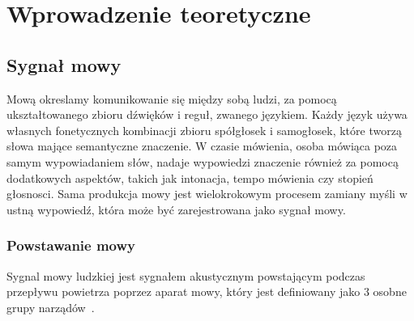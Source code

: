 \documentclass[a4paper,12 pt]{article}
\begin{document}
\section{Wprowadzenie teoretyczne}

\subsection{Sygnał mowy}
Mową okreslamy komunikowanie się między sobą ludzi, za pomocą ukształtowanego zbioru dźwięków i reguł, zwanego językiem. Każdy język używa własnych fonetycznych kombinacji zbioru spółgłosek i samogłosek, które tworzą słowa mające semantyczne znaczenie. W czasie mówienia, osoba mówiąca poza samym wypowiadaniem słów, nadaje wypowiedzi znaczenie również za pomocą dodatkowych aspektów, takich jak intonacja, tempo mówienia czy stopień głosnosci.
Sama produkcja mowy jest wielokrokowym procesem zamiany myśli w ustną wypowiedź, która może być zarejestrowana jako sygnał mowy.


 
\subsubsection{Powstawanie mowy}

Sygnal mowy ludzkiej jest sygnałem akustycznym powstającym podczas przepływu powietrza poprzez aparat mowy, który jest definiowany jako 3 osobne grupy narządów~\cite{speech}.
\end{document}
